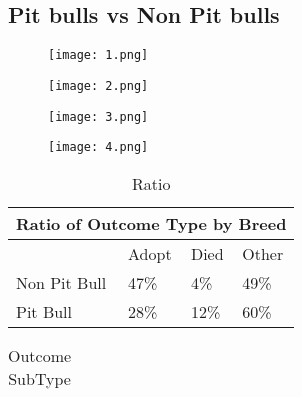 \documentclass[12pt]{article}
\begin{document}
\begin{flushleft}
\subsection{Pit bulls vs Non Pit bulls}
\begin{figure}[H]
    \centering
    \begin{minipage}{0.45\textwidth}
        \centering
        \texttt{[image: 1.png]} %
        \caption{}
    \end{minipage}\hfill
    \begin{minipage}{0.45\textwidth}
        \centering
        \texttt{[image: 2.png]} %
        \caption{}
    \end{minipage}
\end{figure}

\begin{figure}[H]
    \centering
    \begin{minipage}{0.45\textwidth}
        \centering
        \texttt{[image: 3.png]} %
        \caption{}
    \end{minipage}\hfill
    \begin{minipage}{0.45\textwidth}
        \centering
        \texttt{[image: 4.png]} %
        \caption{}
    \end{minipage}
\end{figure}

\begin{table}[H]
\centering
\caption{Ratio}
\begin{tabular}{|l | l  l l|}\hline
\multicolumn {4}{|c|}{ Ratio of Outcome Type by Breed} \\\hline
            & Adopt & Died & Other  \\  
Non Pit Bull&47\%    & 4\%  & 49\%  \\
Pit Bull    &28\%    & 12\%  & 60\%  \\ \hline
\end{tabular}
\end{table}

\begin{table}[H]
\centering
\caption{Outcome SubType}
\begin{tabular}{|l | l  l l l|}\hline


\end{tabular}
\end{table}
\end{flushleft}
\end{document}
